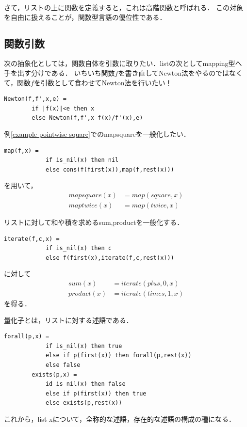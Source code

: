 \documentclass[uplatex, dvipdfmx]{jsreport}
\begin{document}
さて，リストの上に関数を定義すると，これは高階関数と呼ばれる．
この対象を自由に扱えることが，関数型言語の優位性である．

\subsection{関数引数}

次の抽象化としては，関数自体を引数に取りたい．listの次としてmapping型へ手を出す分けである．
いちいち関数$f$を書き直してNewton法をやるのではなくて，関数$f$を引数として食わせてNewton法を行いたい！
\begin{lstlisting}[caption=Newton method]
    Newton(f,f',x,e) = 
        if |f(x)|<e then x
        else Newton(f,f',x-f(x)/f'(x),e)
\end{lstlisting}

\begin{example}[map]
    例\ref{example-pointwise-square}でのmapsquareを一般化したい．
    \begin{lstlisting}[caption=map]
        map(f,x) =
            if is_nil(x) then nil
            else cons(f(first(x)),map(f,rest(x)))
    \end{lstlisting}
    を用いて，
    \begin{align*}
        mapsquare(x) &= map(square,x)\\
        maptwice(x) &= map(twice,x)
    \end{align*}
\end{example}

\begin{example}[iterate]
    リストに対して和や積を求めるsum,productを一般化する．
    \begin{lstlisting}[caption=iteration]
        iterate(f,c,x) =
            if is_nil(x) then c
            else f(first(x),iterate(f,c,rest(x)))
    \end{lstlisting}
    に対して
    \begin{align*}
        sum(x) &= iterate(plus,0,x)\\
        product(x) &= iterate(times,1,x)
    \end{align*}
    を得る．
\end{example}

\begin{example}[forallとexists]
    量化子とは，リストに対する述語である．
    \begin{lstlisting}[caption=quantifier]
        forall(p,x) = 
            if is_nil(x) then true
            else if p(first(x)) then forall(p,rest(x))
            else false
        exists(p,x) =
            id is_nil(x) then false
            else if p(first(x)) then true
            else exists(p,rest(x))
    \end{lstlisting}
    これから，list xについて，全称的な述語，存在的な述語の構成の種になる．
\end{example}
\end{document}
